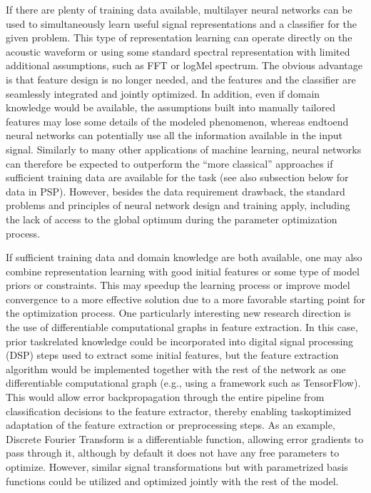 \documentclass[letterpaper,10pt,english]{jupyterBook}
\begin{document}
\sphinxAtStartPar
If there are plenty of training data available, multilayer neural
networks can be used to simultaneously learn useful signal
representations and a classifier for the given problem. This type of
representation learning can operate directly on the acoustic waveform or
using some standard spectral representation with limited additional
assumptions, such as FFT or log\sphinxhyphen{}Mel spectrum. The obvious advantage is
that feature design is no longer needed, and the features and the
classifier are seamlessly integrated and jointly optimized. In addition,
even if domain knowledge would be available, the assumptions built into
manually tailored features may lose some details of the modeled
phenomenon, whereas end\sphinxhyphen{}to\sphinxhyphen{}end neural networks can potentially use all
the information available in the input signal. Similarly to many other
applications of machine learning, neural networks can therefore be
expected to outperform the “more classical” approaches if sufficient
training data are available for the task (see also sub\sphinxhyphen{}section below for
data in PSP). However, besides the data requirement drawback, the
standard problems and principles of neural network design and training
apply, including the lack of access to the global optimum during the
parameter optimization process.

\sphinxAtStartPar
If sufficient training data and domain knowledge are both available, one
may also combine representation learning with good initial features or
some type of model priors or constraints. This may speed\sphinxhyphen{}up the learning
process or improve model convergence to a more effective solution due to
a more favorable starting point for the optimization process. One
particularly interesting new research direction is the use of
differentiable computational graphs in feature extraction. In this case,
prior task\sphinxhyphen{}related knowledge could be incorporated into digital signal
processing (DSP) steps used to extract some initial features, but the
feature extraction algorithm would be implemented together with the rest
of the network as one differentiable computational graph (e.g., using a
framework such as TensorFlow). This would allow error backpropagation
through the entire pipeline from classification decisions to the feature
extractor, thereby enabling task\sphinxhyphen{}optimized adaptation of the feature
extraction or pre\sphinxhyphen{}processing steps. As an example, Discrete Fourier
Transform is a differentiable function, allowing error gradients to pass
through it, although by default it does not have any free parameters to
optimize. However, similar signal transformations but with parametrized
basis functions could be utilized and optimized jointly with the rest of
the model.
\end{document}

